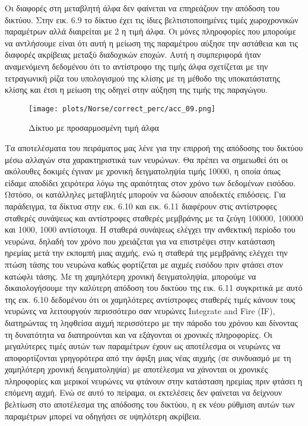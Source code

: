 \documentclass[12pt]{report}
\begin{document}
Οι διαφορές στη μεταβλητή άλφα δεν φαίνεται να επηρεάζουν την απόδοση του δικτύου. Στην εικ. 6.9 το δίκτυο έχει τις ίδιες βελτιστοποιημένες τιμές χωροχρονικών παραμέτρων αλλά διαιρείται με 2 η τιμή άλφα. Οι μόνες πληροφορίες που μπορούμε να αντλήσουμε είναι ότι αυτή η μείωση της παραμέτρου αύξησε την αστάθεια και τις διαφορές ακρίβειας μεταξύ διαδοχικών εποχών. Αυτή η συμπεριφορά ήταν αναμενόμενη δεδομένου ότι το αντίστροφο της τιμής άλφα σχετίζεται με την τετραγωνική ρίζα του υπολογισμού της κλίσης με τη μέθοδο της υποκατάστατης κλίσης και έτσι η μείωση της οδηγεί στην αύξηση της τιμής της παραγώγου.

\begin{figure}[htp] %
    \centering
     \texttt{[image: plots/Norse/correct\_perc/acc\_09.png]}
    \caption{Δίκτυο με προσαρμοσμένη τιμή άλφα}
    \label{fig:representation-methods}
\end{figure}

Τα αποτελέσματα του πειράματος μας λένε για την επιρροή της απόδοσης του δικτύου μέσω αλλαγών στα χαρακτηριστικά των νευρώνων. Θα πρέπει να σημειωθεί ότι οι ακόλουθες δοκιμές έγιναν με χρονική δειγματοληψία τιμής 10000, η οποία όπως είδαμε αποδίδει χειρότερα λόγω της αραιότητας στον χρόνο των δεδομένων εισόδου. Ωστόσο, οι κατάλληλες μεταβλητές μπορούν να δώσουν αποδεκτές επιδόσεις. Για παράδειγμα, τα δίκτυα στην εικ. 6.10 και εικ. 6.11 διαφέρουν στις αντίστροφες σταθερές συνάψεως και αντίστροφες σταθερές μεμβράνης με τα ζεύγη 100000, 100000 και 1000, 1000 αντίστοιχα. Η σταθερά συνάψεως ελέγχει την ανθεκτική περίοδο του νευρώνα, δηλαδή τον χρόνο που χρειάζεται για να επιστρέψει στην κατάσταση ηρεμίας μετά την εκπομπή μιας αιχμής, ενώ η σταθερά της μεμβράνης ελέγχει την πτώση τάσης του νευρώνα καθώς φορτίζεται με αιχμές εισόδου πριν φτάσει στον κατώφλι τάσης. Με τη χαμηλότερη χρονική δειγματοληψία, μπορούμε να δικαιολογήσουμε την καλύτερη απόδοση του δικτύου της εικ. 6.11 συγκριτικά με αυτό της εικ. 6.10 δεδομένου ότι οι χαμηλότερες αντίστροφες σταθερές τιμές κάνουν τους νευρώνες να λειτουργούν περισσότερο σαν νευρώνες \textlatin{Integrate and Fire (IF)}, διατηρώντας τη ληφθείσα αιχμή περισσότερο με την πάροδο του χρόνου και δίνοντας τη δυνατότητα να διατηρούνται και να εξάγονται οι χρονικές πληροφορίες. Οι μεγαλύτερες τιμές αυτών των παραμέτρων έχουν ως αποτέλεσμα οι νευρώνες να αποφορτίζονται γρηγορότερα από την άφιξη μιας νέας αιχμής (σε συνδυασμό με τη χαμηλότερη χρονική δειγματοληψία) με αποτέλεσμα να χάνονται οι χρονικές πληροφορίες και μερικοί νευρώνες να φτάνουν στην κατάσταση ηρεμίας πριν φτάσει η επόμενη αιχμή. Ενώ σε αυτό το πείραμα, οι εκτελέσεις δεν φαίνεται να δείχνουν βελτίωση στο αποτέλεσμα της απόδοσης του δικτύου, η εκ νέου ρύθμιση αυτών των παραμέτρων μπορεί να οδηγήσει σε υψηλότερη ακρίβεια.
\end{document}
